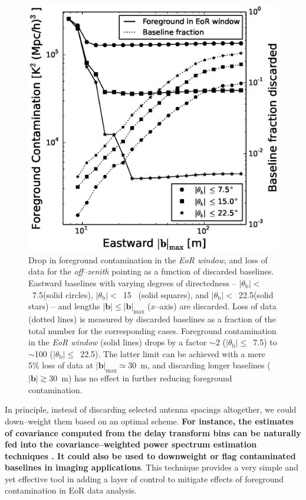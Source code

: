 \documentclass[preprint2,iop,numberedappendix]{emulateapj}
\begin{document}
\begin{figure}[htb]
\centering
\includegraphics[width=\linewidth]{fig13.eps}
\caption{Drop in foreground contamination in the {\it EoR window}, and loss of data for the {\it off--zenith} pointing as a function of discarded baselines. Eastward baselines with varying degrees of directedness -- $|\theta_\textrm{b}|<$~7.5\arcdeg (solid circles), $|\theta_\textrm{b}|<$~15\arcdeg~ (solid squares), and $|\theta_\textrm{b}|<$~22.5\arcdeg (solid stars) -- and lengths $|\boldsymbol{b}| \le |\boldsymbol{b}|_\textrm{max}$ ($x$--axis) are discarded. Loss of data (dotted lines) is measured by discarded baselines as a fraction of the total number for the corresponding cases. Foreground contamination in the {\it EoR window} (solid lines) drops by a factor $\sim$2 ($|\theta_\textrm{b}|\le$~7.5\arcdeg) to $\sim$100 ($|\theta_\textrm{b}|\le$~22.5\arcdeg). The latter limit can be achieved with a mere 5\% loss of data at $|\boldsymbol{b}|_\textrm{max}\simeq30$~m, and discarding longer baselines ($|\boldsymbol{b}|\gtrsim 30$~m) has no effect in further reducing foreground contamination. \label{fig:screening}}
\end{figure}

In principle, instead of discarding selected antenna spacings altogether, we could down--weight them based on an optimal scheme. {\bf For instance, the estimates of covariance computed from the delay transform bins can be naturally fed into the covariance--weighted power spectrum estimation techniques \citep{liu14a,liu14b}. It could also be used to downweight or flag contaminated baselines in imaging applications}. This technique provides a very simple and yet effective tool in adding a layer of control to mitigate effects of foreground contamination in EoR data analysis. 
\end{document}

